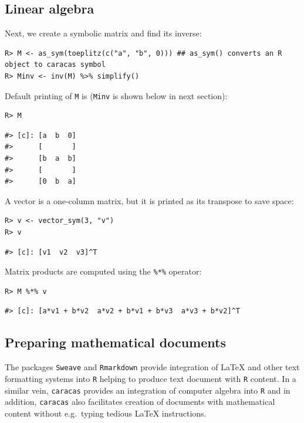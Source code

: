 \hypertarget{linear-algebra}{%
\subsection{Linear algebra}\label{linear-algebra}}

Next, we create a symbolic matrix and find its inverse:

\begin{verbatim}
R> M <- as_sym(toeplitz(c("a", "b", 0))) ## as_sym() converts an R object to caracas symbol
R> Minv <- inv(M) %>% simplify()
\end{verbatim}

Default printing of \texttt{M} is (\texttt{Minv} is shown below in next section):

\begin{verbatim}
R> M
\end{verbatim}

\begin{verbatim}
#> [c]: [a  b  0]
#>      [       ]
#>      [b  a  b]
#>      [       ]
#>      [0  b  a]
\end{verbatim}

A vector is a one-column matrix, but it is printed as its transpose to save space:

\begin{verbatim}
R> v <- vector_sym(3, "v")
R> v
\end{verbatim}

\begin{verbatim}
#> [c]: [v1  v2  v3]^T
\end{verbatim}

Matrix products are computed using the \texttt{\%*\%} operator:

\begin{verbatim}
R> M %*% v
\end{verbatim}

\begin{verbatim}
#> [c]: [a*v1 + b*v2  a*v2 + b*v1 + b*v3  a*v3 + b*v2]^T
\end{verbatim}

\hypertarget{preparing-mathematical-documents}{%
\subsection{Preparing mathematical documents}\label{preparing-mathematical-documents}}

The packages \texttt{Sweave} \citep{leisch:02} and \texttt{Rmarkdown} \citep{rmarkdown} provide
integration of LaTeX and other text formatting systems into \texttt{R} helping to produce
text document with \texttt{R} content. In a similar vein, \texttt{caracas} provides an integration
of computer algebra into \texttt{R} and in addition, \texttt{caracas} also facilitates creation
of documents with mathematical content without e.g.~typing tedious
LaTeX instructions.

